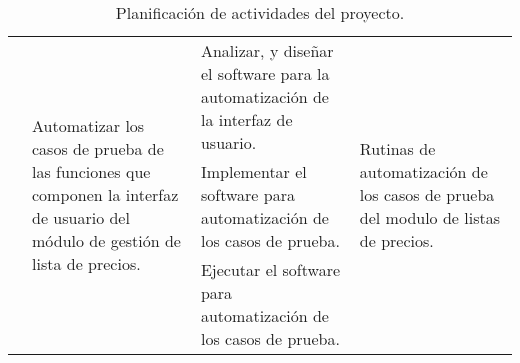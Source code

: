 \begin{sidewaystable}
{\begin{tabular}{|l|l|p{6.5cm}|l|}
& \multirow{3}{4.0cm}{Automatizar los casos de prueba de las funciones que
componen la interfaz de usuario del módulo de gestión de lista de precios.} &
Analizar, y diseñar el software para la automatización de la interfaz de
usuario. &
\multirow{3}{4.0cm}{Rutinas de automatización de los casos de prueba del modulo
de listas de precios.} \\
\cline{3-3}
& & Implementar el software para automatización de los casos de prueba. & \\
\cline{3-3}
& & Ejecutar el software para automatización de los casos de prueba. & \\
\hline
\end{tabular}}
\caption{Planificación de actividades del proyecto.}
\label{planificacion}
\end{sidewaystable}

